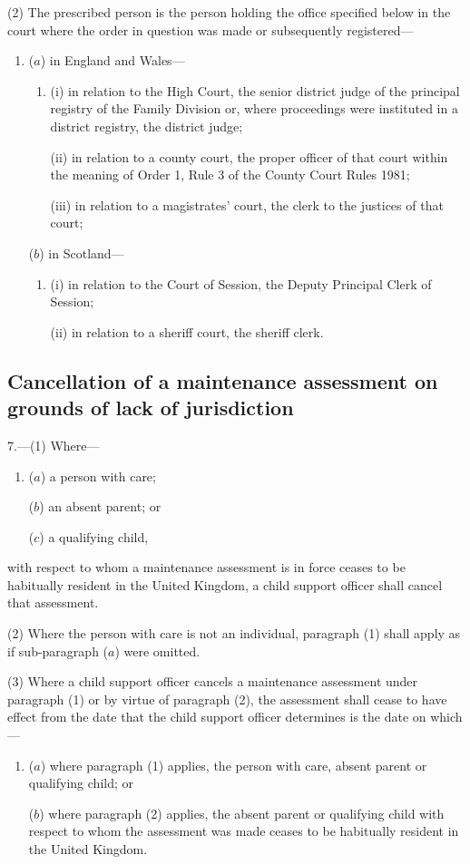 \documentclass[a4paper]{article}
\begin{document}
(2) The prescribed person is the person holding the office specified below in the court where the order in question was made or subsequently registered—
\begin{enumerate}\item[]
($a$) in England and Wales—
\begin{enumerate}\item[]
(i) in relation to the High Court, the senior district judge of the principal registry of the Family Division or, where proceedings were instituted in a district registry, the district judge;

(ii) in relation to a county court, the proper officer of that court within the meaning of Order 1, Rule 3 of the County Court Rules 1981;

(iii) in relation to a magistrates' court, the clerk to the justices of that court;
\end{enumerate}

($b$) in Scotland—
\begin{enumerate}\item[]
(i) in relation to the Court of Session, the Deputy Principal Clerk of Session;

(ii) in relation to a sheriff court, the sheriff clerk.
\end{enumerate}
\end{enumerate}

\subsection[7. Cancellation of a maintenance assessment on grounds of lack of jurisdiction]{Cancellation of a maintenance assessment on grounds of lack of jurisdiction}

7.—(1) Where—
\begin{enumerate}\item[]
($a$) a person with care;

($b$) an absent parent; or

($c$) a qualifying child,
\end{enumerate}
with respect to whom a maintenance assessment is in force ceases to be habitually resident in the United Kingdom, a child support officer shall cancel that assessment.

(2) Where the person with care is not an individual, paragraph (1) shall apply as if sub-paragraph ($a$) were omitted.

(3) Where a child support officer cancels a maintenance assessment under paragraph (1) or by virtue of paragraph (2), the assessment shall cease to have effect from the date that the child support officer determines is the date on which—
\begin{enumerate}\item[]
($a$) where paragraph (1) applies, the person with care, absent parent or qualifying child; or

($b$) where paragraph (2) applies, the absent parent or qualifying child
with respect to whom the assessment was made ceases to be habitually resident in the United Kingdom.
\end{enumerate}
\end{document}
